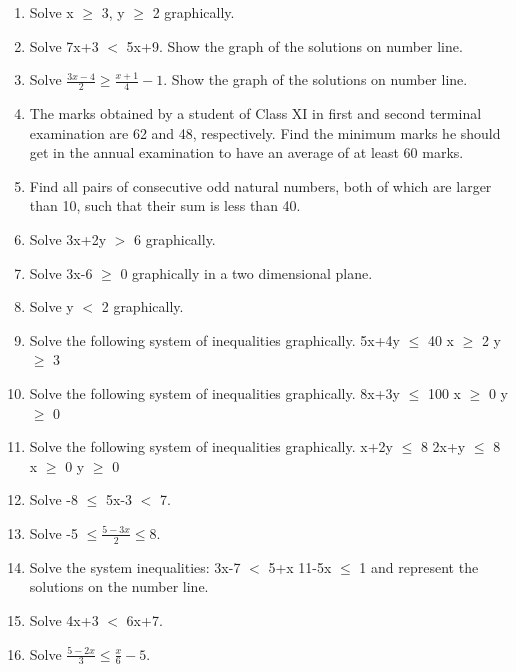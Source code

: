 \renewcommand{\theequation}{\theenumi}
\begin{enumerate}[label=\arabic*.,ref=\thesubsection.\theenumi]

\item Solve  x $\geq$ 3, y $\geq$ 2 graphically.
\\
\solution 


    \item Solve 7x+3 $<$ 5x+9. Show the graph of the solutions on number line.
    \item Solve $\frac{3x-4}{2} \geq \frac{x+1}{4}-1$. Show the graph of the solutions on number line.
\\
\solution 

    \item The marks obtained by a student of Class XI in first and second terminal examination are 62 and 48, respectively. Find the minimum marks he should get in the annual examination to have an average of at least 60 marks.
\\
\solution 

    \item Find all pairs of consecutive odd natural numbers, both of which are larger than 10, such that their sum is less than 40.
    \item Solve 3x+2y $>$ 6 graphically.
    \item Solve 3x-6 $\geq$ 0 graphically in a two dimensional plane.
    \item Solve y $<$ 2 graphically.
    \item Solve the following system of inequalities graphically.
     5x+4y $\leq$ 40
     x $\geq$ 2
     y $\geq$ 3
     \item Solve the following system of inequalities graphically.
     8x+3y $\leq$ 100
     x $\geq$ 0
     y $\geq$ 0
     \item Solve the following system of inequalities graphically.
     x+2y $\leq$ 8
     2x+y $\leq$ 8
     x $\geq$ 0
     y $\geq$ 0
     \item Solve -8 $\leq$ 5x-3 $<$ 7.
     \item Solve -5 $\leq \frac{5-3x}{2} \leq 8$.
     \item Solve the system inequalities:
     3x-7 $<$ 5+x
     11-5x $\leq$ 1
     and represent the solutions on the number line.
    
    \item Solve 4x+3 $<$ 6x+7.
    \item Solve $\frac{5-2x}{3} \leq \frac{x}{6}-5$.


\end{enumerate}
